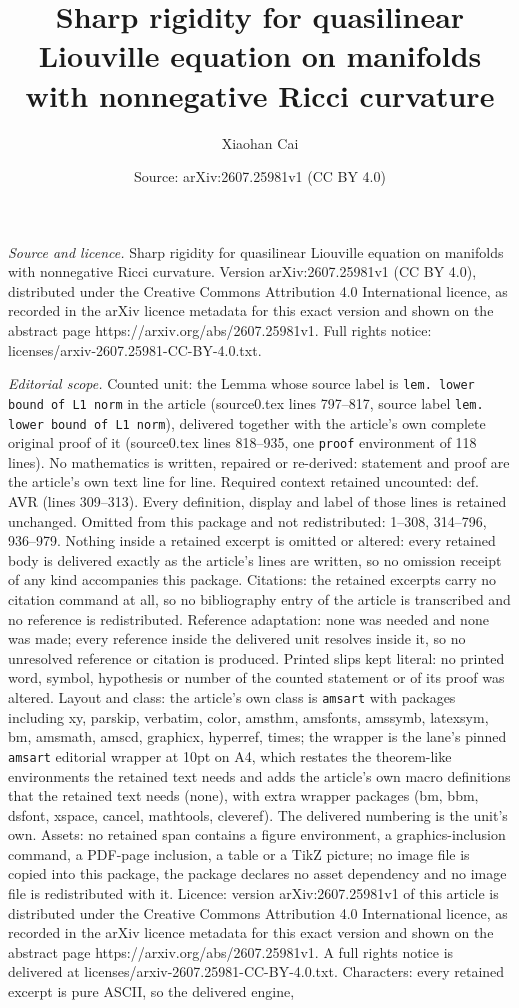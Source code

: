 \documentclass[10pt,a4paper]{amsart}
\title[Sharp rigidity for quasilinear Liouville equation on manifol]{Sharp rigidity for quasilinear Liouville equation on manifolds with nonnegative Ricci curvature}
\author{Xiaohan Cai}
\date{Source: arXiv:2607.25981v1 (CC BY 4.0)}
\begin{document}
\maketitle

\noindent\emph{Source and licence.} Sharp rigidity for quasilinear Liouville equation on manifolds with nonnegative Ricci curvature. Version arXiv:2607.25981v1 (CC BY 4.0), distributed under the Creative Commons Attribution 4.0 International licence, as recorded in the arXiv licence metadata for this exact version and shown on the abstract page https://arxiv.org/abs/2607.25981v1. Full rights notice: licenses/arxiv-2607.25981-CC-BY-4.0.txt.\par\smallskip

\noindent\textit{Editorial scope.} Counted unit: the Lemma whose source label is \texttt{lem. lower bound of L1 norm} in the article (source0.tex lines 797--817, source label \texttt{lem. lower bound of L1 norm}), delivered together with the article's own complete original proof of it (source0.tex lines 818--935, one \texttt{proof} environment of 118 lines). No mathematics is written, repaired or re-derived: statement and proof are the article's own text line for line. Required context retained uncounted: def. AVR (lines 309--313). Every definition, display and label of those lines is retained unchanged. Omitted from this package and not redistributed: 1--308, 314--796, 936--979. Nothing inside a retained excerpt is omitted or altered: every retained body is delivered exactly as the article's lines are written, so no omission receipt of any kind accompanies this package. Citations: the retained excerpts carry no citation command at all, so no bibliography entry of the article is transcribed and no reference is redistributed. Reference adaptation: none was needed and none was made; every reference inside the delivered unit resolves inside it, so no unresolved reference or citation is produced. Printed slips kept literal: no printed word, symbol, hypothesis or number of the counted statement or of its proof was altered. Layout and class: the article's own class is \texttt{amsart} with packages including xy, parskip, verbatim, color, amsthm, amsfonts, amssymb, latexsym, bm, amsmath, amscd, graphicx, hyperref, times; the wrapper is the lane's pinned \texttt{amsart} editorial wrapper at 10pt on A4, which restates the theorem-like environments the retained text needs and adds the article's own macro definitions that the retained text needs (none), with extra wrapper packages (bm, bbm, dsfont, xspace, cancel, mathtools, cleveref). The delivered numbering is the unit's own. Assets: no retained span contains a figure environment, a graphics-inclusion command, a PDF-page inclusion, a table or a TikZ picture; no image file is copied into this package, the package declares no asset dependency and no image file is redistributed with it. Licence: version arXiv:2607.25981v1 of this article is distributed under the Creative Commons Attribution 4.0 International licence, as recorded in the arXiv licence metadata for this exact version and shown on the abstract page https://arxiv.org/abs/2607.25981v1. A full rights notice is delivered at licenses/arxiv-2607.25981-CC-BY-4.0.txt. Characters: every retained excerpt is pure ASCII, so the delivered engine, 
\end{document}

